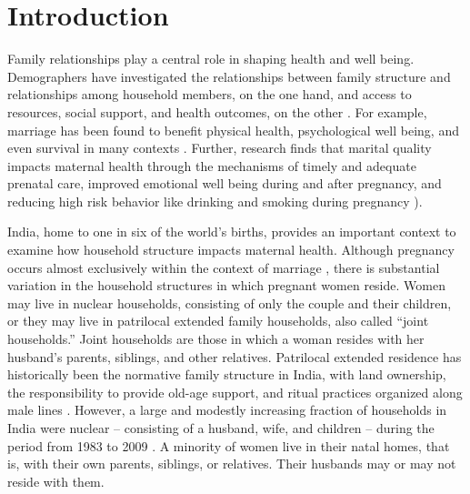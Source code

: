 \documentclass[10pt,twoside,reqno]{article}
\begin{document}
\vspace*{12pt}

\setlength{\parskip}{0ex}

\pagestyle{fancy}
\setcounter{footnote}{\autorzahl}


\section{Introduction}\label{Introduction} %

Family relationships play a central role in shaping health and well being. Demographers have investigated the relationships between family structure and relationships among household members, on the one hand, and access to resources, social support, and health outcomes, on the other \citep{lindemann2019family, waite2000family, umberson2010social}. For example, marriage has been found to benefit physical health, psychological well being, and even survival in many contexts \citep{ross1990impact, begashaw2016health, lewis2004conceptualization, soulsby2015marriage, robles2014marital}. Further, research finds that marital quality impacts maternal health through the mechanisms of timely and adequate prenatal care, improved emotional well being during and after pregnancy, and reducing high risk behavior like drinking and smoking during pregnancy \citep{alipour2019relationship,rosand2011partner}).

India, home to one in six of the world’s births, provides an important context to examine how household structure impacts maternal health.  Although pregnancy occurs almost exclusively within the context of marriage \citep{banerji2021does}, there is substantial variation in the household structures in which pregnant women reside. Women may live in nuclear households, consisting of only the couple and their children, or they may live in patrilocal extended family households, also called ``joint households.''  Joint households are those in which a woman resides with her husband’s parents, siblings, and other relatives.  Patrilocal extended residence has historically been the normative family structure in India, with land ownership, the responsibility to provide old-age support, and ritual practices organized along male lines \citep{jayachandran2015roots}.  However, a large and modestly increasing fraction of households in India were nuclear -- consisting of a husband, wife, and children -- during the period from 1983 to 2009 \citep{breton2021modernisation}.  A minority of women live in their natal homes, that is, with their own parents, siblings, or relatives.  Their husbands may or may not reside with them.
\end{document}
